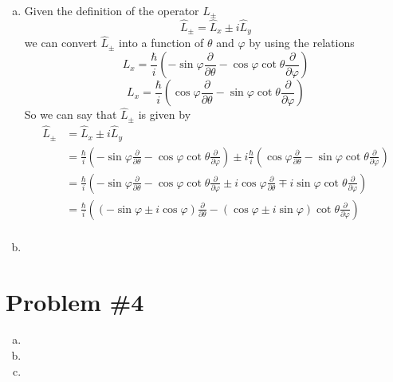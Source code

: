 \documentclass[11pt]{article}
\numberwithin{equation}{section}
\begin{document}
\begin{enumerate}[(a)]
\item
Given the definition of the operator $L_{\pm}$
$$\hat{L}_{\pm} = \hat{L}_x\pm i\hat{L}_y$$
we can convert $\hat{L}_{\pm}$ into a function of $\theta$ and $\varphi$ by using the relations
$$L_{x} = \frac{\hbar}{i}\left(-\sin\varphi\frac{\partial}{\partial\theta}-\cos\varphi\cot\theta\frac{\partial}{\partial\varphi}\right)$$
$$L_{x} = \frac{\hbar}{i}\left(\cos\varphi\frac{\partial}{\partial\theta}-\sin\varphi\cot\theta\frac{\partial}{\partial\varphi}\right)$$
So we can say that $\hat{L}_{\pm}$ is given by
\begin{align*}
\hat{L}_{\pm} &= \hat{L}_x \pm i\hat{L}_y\\
&= \frac{\hbar}{i}\left(-\sin\varphi\frac{\partial}{\partial\theta}-\cos\varphi\cot\theta\frac{\partial}{\partial\varphi}\right) \pm i\frac{\hbar}{i}\left(\cos\varphi\frac{\partial}{\partial\theta}-\sin\varphi\cot\theta\frac{\partial}{\partial\varphi}\right)\\
&= \frac{\hbar}{i}\left(-\sin\varphi\frac{\partial}{\partial\theta}-\cos\varphi\cot\theta\frac{\partial}{\partial\varphi} \pm i\cos\varphi\frac{\partial}{\partial\theta}\mp i\sin\varphi\cot\theta\frac{\partial}{\partial\varphi}\right)\\
&= \frac{\hbar}{i}\left((-\sin\varphi\pm i\cos\varphi)\frac{\partial}{\partial\theta}-(\cos\varphi \pm i\sin\varphi)\cot\theta\frac{\partial}{\partial\varphi}\right)\\
\end{align*}




\item
\end{enumerate}

\section{Problem \#4}
\begin{enumerate}[(a)]
\item
\item
\item
\end{enumerate}
\end{document}
